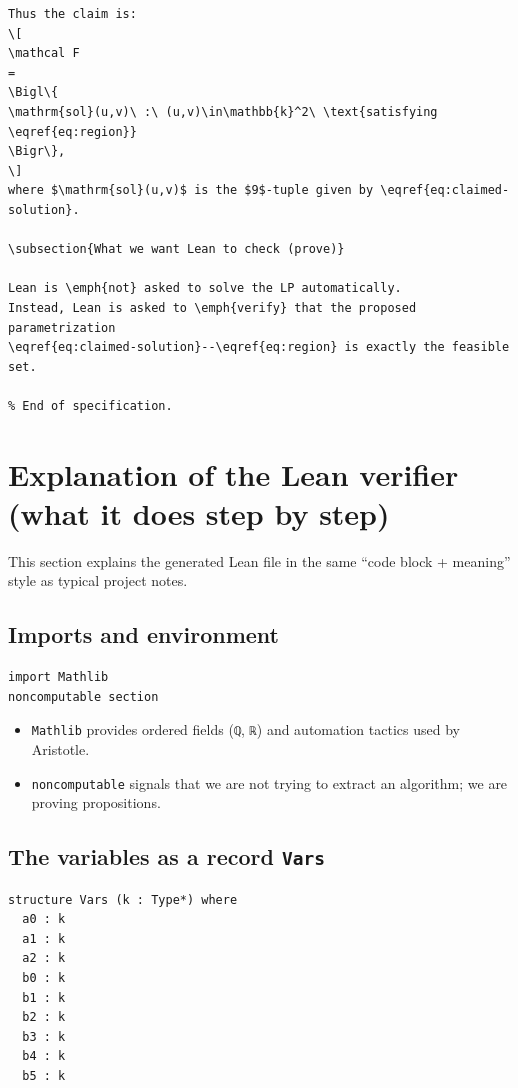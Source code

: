 \documentclass[11pt]{article}
\begin{document}
\begin{verbatim}
Thus the claim is:
\[
\mathcal F
=
\Bigl\{
\mathrm{sol}(u,v)\ :\ (u,v)\in\mathbb{k}^2\ \text{satisfying \eqref{eq:region}}
\Bigr\},
\]
where $\mathrm{sol}(u,v)$ is the $9$-tuple given by \eqref{eq:claimed-solution}.

\subsection{What we want Lean to check (prove)}

Lean is \emph{not} asked to solve the LP automatically.
Instead, Lean is asked to \emph{verify} that the proposed parametrization
\eqref{eq:claimed-solution}--\eqref{eq:region} is exactly the feasible set.

% End of specification.
\end{verbatim}

\section{Explanation of the Lean verifier (what it does step by step)}

This section explains the generated Lean file in the same ``code block + meaning'' style as typical project notes.

\subsection{Imports and environment}

\begin{lstlisting}
import Mathlib
noncomputable section
\end{lstlisting}

\begin{itemize}
\item \texttt{Mathlib} provides ordered fields (\texttt{ℚ}, \texttt{ℝ}) and automation tactics used by Aristotle.
\item \texttt{noncomputable} signals that we are not trying to extract an algorithm; we are proving propositions.
\end{itemize}

\subsection{The variables as a record \texttt{Vars}}

\begin{lstlisting}
structure Vars (k : Type*) where
  a0 : k
  a1 : k
  a2 : k
  b0 : k
  b1 : k
  b2 : k
  b3 : k
  b4 : k
  b5 : k
\end{lstlisting}
\end{document}
